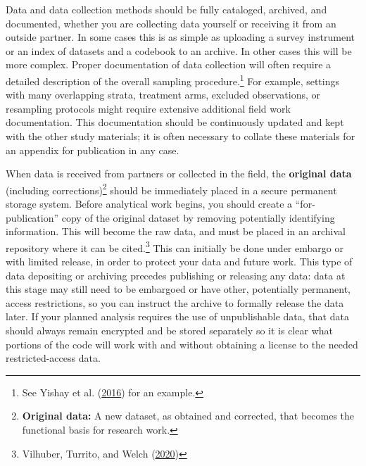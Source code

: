 \documentclass[
]{book}
\begin{document}
Data and data collection methods should be fully cataloged, archived, and documented,
whether you are collecting data yourself or receiving it from an outside partner.
In some cases this is as simple as uploading
a survey instrument or an index of datasets and a codebook to an archive.
In other cases this will be more complex.
Proper documentation of data collection will often require
a detailed description of the overall sampling procedure.\footnote{See Yishay et al. (\protect\hyperlink{ref-yishay2016gender}{2016}) for an example.}
For example, settings with many overlapping strata,
treatment arms, excluded observations, or resampling protocols
might require extensive additional field work documentation.
This documentation should be continuously updated
and kept with the other study materials;
it is often necessary to collate these materials
for an appendix for publication in any case.

When data is received from partners or collected in the field,
the \textbf{original data} (including corrections)\footnote{\textbf{Original data:} A new dataset, as obtained and corrected,
  that becomes the functional basis for research work.}
should be immediately placed in a secure permanent storage system.
Before analytical work begins, you should create a ``for-publication''
copy of the original dataset by removing potentially identifying information.
This will become the raw data, and must be
placed in an archival repository where it can be cited.\footnote{Vilhuber, Turrito, and Welch (\protect\hyperlink{ref-vilhuber2020report}{2020})}
This can initially be done under embargo or with limited release,
in order to protect your data and future work.
This type of data depositing or archiving
precedes publishing or releasing any data:
data at this stage may still need to be embargoed
or have other, potentially permanent, access restrictions,
so you can instruct the archive to formally release the data later.
If your planned analysis requires the use of unpublishable data,
that data should always remain encrypted and be stored separately
so it is clear what portions of the code will work with and without
obtaining a license to the needed restricted-access data.
\end{document}
